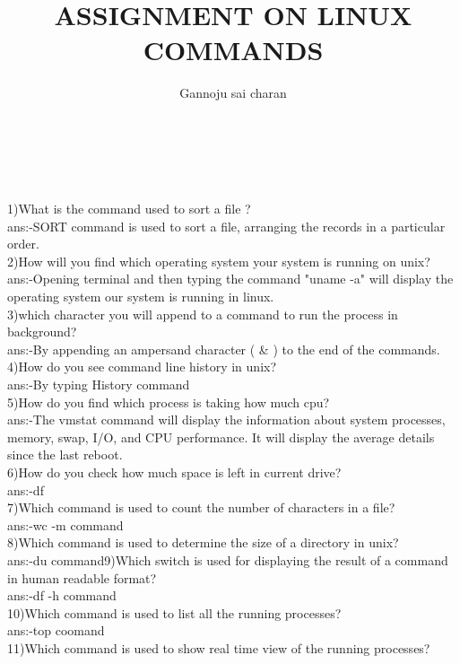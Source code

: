 \documentclass{article}
\author{Gannoju sai charan}
\begin{document}
\title{ASSIGNMENT ON LINUX COMMANDS}

\maketitle
\\


\Large{
\\1)What is the command used to sort a file ?\\
ans:-SORT command is used to sort a file, arranging the records in a particular order.\\
2)How will you find which operating system your system is running on unix?\\
ans:-Opening terminal and then typing the command "uname -a" will display the operating system
our system is running in linux.\\
3)which character you will append to a command to run the process in background?\\
ans:-By appending an ampersand character ( & ) to the end of the commands.\\
4)How do you see command line history in unix?\\
ans:-By typing History command\\
5)How do you find which process is taking how much cpu?\\
ans:-The vmstat command will display the information about system processes, memory, swap, I/O,
and CPU performance. It will display the average details since the last reboot.\\
6)How do you check how much space is left in current drive?\\
ans:-df\\
7)Which command is used to count the number of characters in a file?\\
ans:-wc -m command\\
8)Which command is used to determine the size of a directory in unix?\\
ans:-du command9)Which switch is used for displaying the result of a command in human readable format?\\
ans:-df -h command\\
10)Which command is used to list all the running processes?\\
ans:-top coomand\\
11)Which command is used to show real time view of the running processes?\\
}
\end{document}
